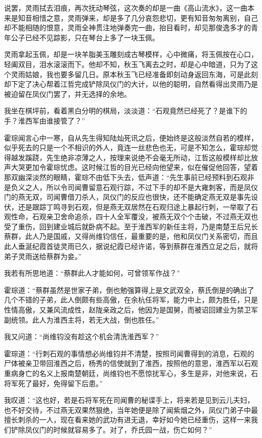 说罢，灵雨拭去泪痕，再次抚动琴弦，这次奏的却是一曲《高山流水》，这一曲本来是知音相惜之意，灵雨弹来，却是多了几分哀怨悲切，更有知音匆匆离别，自己却不能相随的恨意，灵雨全神贯注地弹奏完一曲，抬目看时，却见那俊逸多才的青年公子已经不见踪影，只在琴台上多了一块玉佩。

灵雨拿起玉佩，却是一块羊脂美玉雕刻成古琴模样，心中微痛，将玉佩按在心口，轻阖双目，泪水滚滚而下。他却不知，秋玉飞离去之时，却是心中暗道，只为了这个灵雨姑娘，我也要多留几日。原本秋玉飞已经准备即刻动身返回东海，可是此刻却下定了决心帮着江哲完成铲除凤仪门的大计，以他的聪明，自然看得出灵雨乃是被迫留在凤仪门罢了，并无选择的余地。

我坐在棋坪前，看着黑白分明的棋局，淡淡道：“石观竟然已经死了？是谁下的手？淮西军由谁接管了？”

霍琮闻言心中一寒，自从先生得知陆灿死讯之后，便始终是这般淡然自若的模样，似乎死去的只是一个不相识的外人，竟连一丝悲色也无，可是不知怎么，霍琮却觉得越发蹊跷，先生绝非凉薄之人，按理来说绝不会毫无所动，江哲这般模样却比放声大哭更加令霍琮忧虑。这时候江哲的目光已经向他望来，似在催促他回答，望着那双幽深淡然的眼睛，霍琮不由低下头去，低声道：“先生事前已经预料到石观非是负义之人，所以令司闻曹留意石观行踪，不过下手的却不是大雍刺客，而是凤仪门的燕无双，司闻曹借刀杀人，凤仪门的反应也很快，还不能确定燕无双是事先设伏，还是跟踪丁鸣寻到石观，但是燕无双居然在石观归途上暴起行刺，一举取了石观性命，石观亲卫舍命追杀，四十人全军覆没，被燕无双个个击破，不过燕无双也受了重伤，回到建业城后就卧病不起。至于淮西军的新任主将，乃是南楚王后兄长蔡群，此人乃是国戚，又得尚维钧信任，最重要的是，他和凤仪门关系密切，而且此人垂涎纪霞首徒灵雨已久，据说纪霞已经许诺，等到蔡群在淮西立足之后，就将弟子灵雨送给蔡群为妾。”

我若有所思地道：“蔡群此人才能如何，可曾领军作战？”

霍琮道：“蔡群虽然是世家子弟，倒也勉强算得上是文武双全，蔡氏倒是的确出了几个不错的子弟，此人倒颇有些高傲，在余杭任将军，能力中上，颇为胜任，只是性情高傲，又兼风流成性，赵陇亲政之后，他因为是国舅，而被诏回建业为禁卫军副统领。此人为淮西主将，若无大战，倒也胜任。”

我又问道：“尚维钧没有趁这个机会清洗淮西军？”

霍琮道：“行刺石观的事情想必尚维钧并不清楚，按照司闻曹得到的消息，石观的尸体被亲卫带回淮西之后，杨秀的信使就到了淮西，按照他的意思，淮西军以石观重病身亡的名义上报南楚朝廷，尚维钧也不愿惊扰军心，多生是非，对他来说，石将军死了最好，免得留下后患。”

我叹道：“这也好，若是石将军死在司闻曹的秘谍手上，将来若是见到云儿夫妇，也不好交待，不过燕无双果然狠绝，当年她便是除了闻紫烟之外，凤仪门弟子中最擅长刺杀的一人，现在看来她的武功有进无退，幸好如今她已经重伤，这样一来我们铲除凤仪门的时候就容易多了。对了，乔氏园一战，伤亡如何？”

